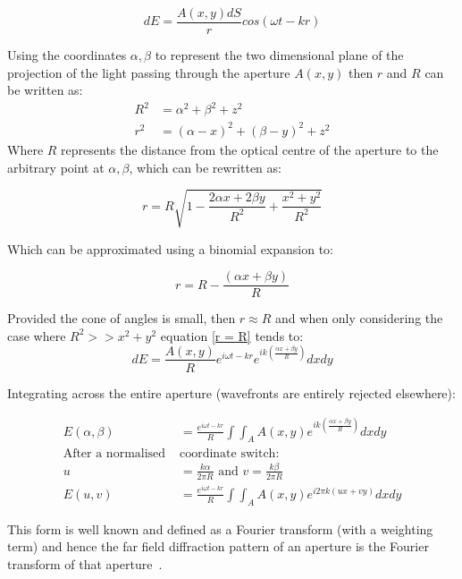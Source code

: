 \begin{equation}
dE = \frac{A(x,y)dS}{r} cos(\omega t -kr)
\end{equation}

Using the coordinates $\alpha,\beta$ to represent the two dimensional plane of the projection of the light passing through the aperture $A(x,y)$ then $r$ and $R$ can be written as:
\begin{align}
R^2 &= \alpha ^2 + \beta ^ 2+ z^2  \\
r^2 &= (\alpha - x)^2 + (\beta - y)^2 + z^2
\end{align}
Where $R$ represents the distance from the optical centre of the aperture to the arbitrary point at $\alpha,\beta$, which can be rewritten as:

\begin{equation}
r = R \sqrt{1 - \frac{2 \alpha x + 2 \beta y}{R^2} + \frac{x^2 + y^2}{R^2}}  \label{r = R}
\end{equation}

Which can be approximated using a binomial expansion to:

\begin{equation}
r = R - \frac{(\alpha x + \beta y)}{R}
\end{equation}

Provided the cone of angles is small, then $r \approx R$ and when only considering the case where $R^2 >> x^2 + y^2$ equation \eqref{r = R} tends to:
\begin{equation}
dE = \frac{A(x,y)}{R} e^{i \omega t - kr} e^{ik \left(\frac{\alpha x + \beta y}{R}\right)} dxdy
\end{equation}

Integrating across the entire aperture (wavefronts are entirely rejected elsewhere):


\begin{align}
E(\alpha,\beta) &= \frac{e^{i \omega t - kr}}{R} \int\int_{A}^{} A(x,y) e^{ik \left(\frac{\alpha x + \beta y}{R}\right)} dxdy
\\  \text{After a normalised } &\text{coordinate switch:} \nonumber \\
u &= \frac{k \alpha}{2 \pi R}  \text{ and }   v = \frac{k \beta}{2 \pi R}
\\ E(u,v)&=\frac{e^{i \omega t - kr}}{R} \int\int_{A}^{} A(x,y) e^{i2 \pi k \left(ux + vy\right)} dxdy
\end{align}

This form is well known and defined as a Fourier transform (with a weighting term) and hence the far field diffraction pattern of an aperture is the Fourier transform of that aperture~\cite{goodmanIntroductionFourierOptics1996}.

